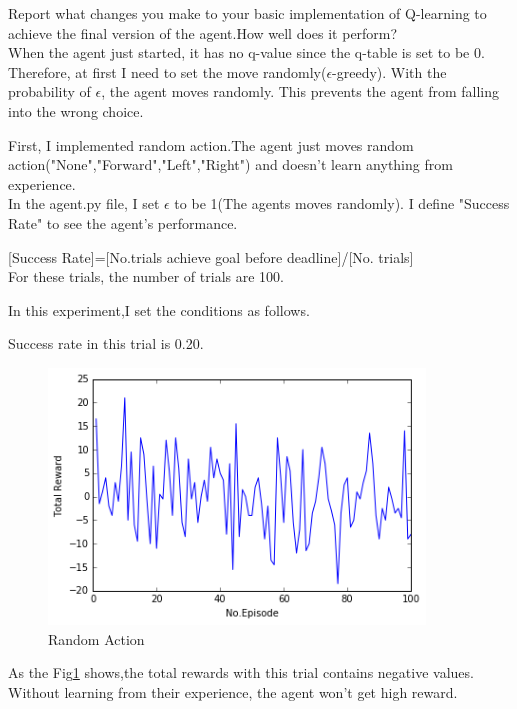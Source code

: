 \documentclass[a4paper,11pt]{article}
\begin{document}
Report what changes you make to your basic implementation of Q-learning to achieve the final version of the agent.How well does it perform?
\\
When the agent just started, it has no q-value since the q-table is set to be 0. Therefore, at first I need to set the move randomly($\epsilon$-greedy).
With the probability of $\epsilon$, the agent moves randomly. This prevents the agent from falling into the wrong choice. 



First, I implemented random action.The agent just moves random action("None","Forward","Left","Right") and doesn't learn anything from experience.
\\
In the agent.py file, I set $\epsilon$ to be 1(The agents moves randomly).
I define "Success Rate" to see the agent's performance.

[Success Rate]=[No.trials achieve goal before deadline]/[No. trials]
\\For these trials, the number of trials are 100.

In this experiment,I set the conditions as follows.


Success rate in this trial is 0.20.




        


\begin{figure}[H]
\begin{center}
\includegraphics[width=100mm]{graph/random.jpg}
\end{center}
\caption{Random Action}
\label{fig:one}
\end{figure}

As the Fig\ref{fig:one} shows,the total rewards with this trial contains negative values.
Without learning from their experience, the agent won't get high reward.
\end{document}
